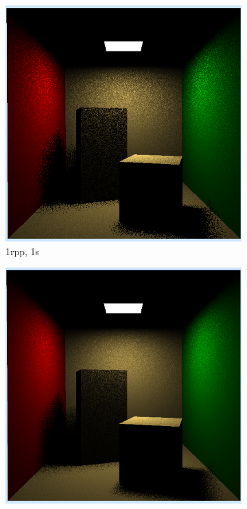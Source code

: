 \begin{figure}[h]
	\centering
	\begin{subfigure}[b]{0.4\textwidth}
		\includegraphics[width=\textwidth]{week4/arealight_1rpp_1s.png}
		\caption{1rpp, 1s}
	\end{subfigure}
	\begin{subfigure}[b]{0.4\textwidth}
		\includegraphics[width=\textwidth]{week4/arealight_4rpp_2s.png}

\end{subfigure}
\end{figure}
